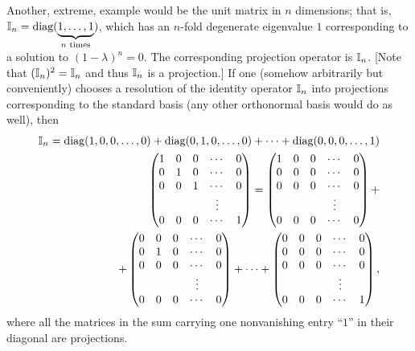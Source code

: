 {Another, extreme, example would be the unit matrix in $n$ dimensions; that is,
${\Bbb I}_n=\textrm{diag}(\underbrace{1,\ldots ,1}_{n \textrm{ times}})$,
which has an $n$-fold degenerate eigenvalue $1$ corresponding to a solution to
$(1-\lambda )^n=0$.
The corresponding projection operator is ${\Bbb I}_n$.  [Note that $({\Bbb I}_n)^2 ={\Bbb I}_n$
and thus ${\Bbb I}_n$ is a projection.]
If one (somehow arbitrarily but conveniently) chooses a resolution of the identity operator ${\Bbb I}_n$
into projections corresponding to the standard basis (any other orthonormal basis would do as well),
then
\begin{equation}
\begin{split}
{\Bbb I}_n = \textrm{diag}( 1,0,0,\ldots ,0 )
+   \textrm{diag}( 0,1,0,\ldots ,0 )
+ \cdots
+   \textrm{diag}( 0,0,0,\ldots ,1 )\\
\begin{pmatrix}
 1&0&0&\cdots &0\\
 0&1&0&\cdots &0\\
 0&0&1&\cdots &0\\
&&&\vdots&\\
 0&0&0&\cdots &1
\end{pmatrix}  =
\begin{pmatrix}
 1&0&0&\cdots &0\\
 0&0&0&\cdots &0\\
 0&0&0&\cdots &0\\
&&&\vdots&\\
 0&0&0&\cdots &0
\end{pmatrix}  +
\\
\quad
+%
\begin{pmatrix}
 0&0&0&\cdots &0\\
 0&1&0&\cdots &0\\
 0&0&0&\cdots &0\\
&&&\vdots&\\
 0&0&0&\cdots &0
\end{pmatrix} +\cdots
+%
\begin{pmatrix}
 0&0&0&\cdots &0\\
 0&0&0&\cdots &0\\
 0&0&0&\cdots &0\\
&&&\vdots&\\
 0&0&0&\cdots &1
\end{pmatrix}
,
\end{split}
\end{equation}
where all the matrices in the sum carrying one nonvanishing entry ``$1$''
in their diagonal are  projections.
}
